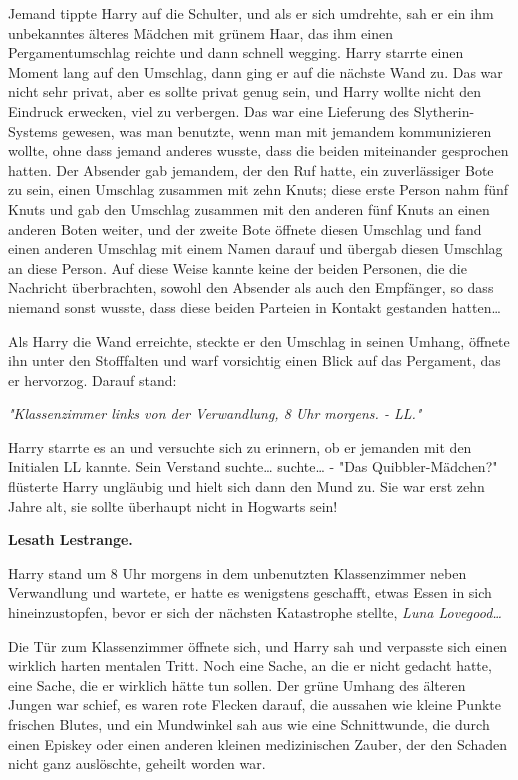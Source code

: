 {Jemand tippte Harry auf die Schulter, und als er sich umdrehte, sah er ein ihm unbekanntes älteres Mädchen mit grünem Haar, das ihm einen Pergamentumschlag reichte und dann schnell wegging. Harry starrte einen Moment lang auf den Umschlag, dann ging er auf die nächste Wand zu. Das war nicht sehr privat, aber es sollte privat genug sein, und Harry wollte nicht den Eindruck erwecken, viel zu verbergen. Das war eine Lieferung des Slytherin-Systems gewesen, was man benutzte, wenn man mit jemandem kommunizieren wollte, ohne dass jemand anderes wusste, dass die beiden miteinander gesprochen hatten. Der Absender gab jemandem, der den Ruf hatte, ein zuverlässiger Bote zu sein, einen Umschlag zusammen mit zehn Knuts; diese erste Person nahm fünf Knuts und gab den Umschlag zusammen mit den anderen fünf Knuts an einen anderen Boten weiter, und der zweite Bote öffnete diesen Umschlag und fand einen anderen Umschlag mit einem Namen darauf und übergab diesen Umschlag an diese Person. Auf diese Weise kannte keine der beiden Personen, die die Nachricht überbrachten, sowohl den Absender als auch den Empfänger, so dass niemand sonst wusste, dass diese beiden Parteien in Kontakt gestanden hatten…

Als Harry die Wand erreichte, steckte er den Umschlag in seinen Umhang, öffnete ihn unter den Stofffalten und warf vorsichtig einen Blick auf das Pergament, das er hervorzog. Darauf stand:

\emph{"Klassenzimmer links von der Verwandlung, 8 Uhr morgens. - LL."}

Harry starrte es an und versuchte sich zu erinnern, ob er jemanden mit den Initialen LL kannte. Sein Verstand suchte… suchte… - "Das Quibbler-Mädchen?" flüsterte Harry ungläubig und hielt sich dann den Mund zu. Sie war erst zehn Jahre alt, sie sollte überhaupt nicht in Hogwarts sein!

\textbf{Lesath Lestrange.}

Harry stand um 8 Uhr morgens in dem unbenutzten Klassenzimmer neben Verwandlung und wartete, er hatte es wenigstens geschafft, etwas Essen in sich hineinzustopfen, bevor er sich der nächsten Katastrophe stellte, \emph{Luna Lovegood…}

Die Tür zum Klassenzimmer öffnete sich, und Harry sah und verpasste sich einen wirklich harten mentalen Tritt. Noch eine Sache, an die er nicht gedacht hatte, eine Sache, die er wirklich hätte tun sollen. Der grüne Umhang des älteren Jungen war schief, es waren rote Flecken darauf, die aussahen wie kleine Punkte frischen Blutes, und ein Mundwinkel sah aus wie eine Schnittwunde, die durch einen Episkey oder einen anderen kleinen medizinischen Zauber, der den Schaden nicht ganz auslöschte, geheilt worden war.

}
